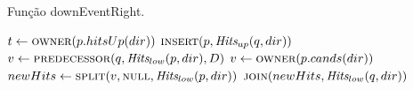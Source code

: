 \begin{algorithm}[H]
    \caption[Algoritmo \textsc{downEventRight} do par mais próximo cinético]{Função downEventRight.} \label{alg:par-cinetico:eventodowncaso2}
    \begin{algorithmic}[1]
            \State $t \leftarrow \Call{owner}{p.hitsUp(dir)}$
                \State {}
            \EndIf
            \State $\Call{insert}{p, \Hits_{up}(q, dir)}$
            \State $v \leftarrow \Call{predecessor}{q, \Hits_{low}(p, dir), D}$
                \State $v \leftarrow \Call{owner}{p.cands(dir)}$
            \EndIf
            \State $newHits \leftarrow \Call{split}{v, \nnull, \Hits_{low}(p,dir)}$
            \State $\Call{join}{newHits, \Hits_{low}(q, dir)}$
            \State {}
                \State {}
            \EndIf
        \EndFunction
    \end{algorithmic}
\end{algorithm}